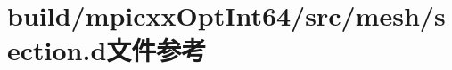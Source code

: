 \hypertarget{build_2mpicxxOptInt64_2src_2mesh_2section_8d}{
\section{build/mpicxxOptInt64/src/mesh/section.d文件参考}
\label{build_2mpicxxOptInt64_2src_2mesh_2section_8d}
}
